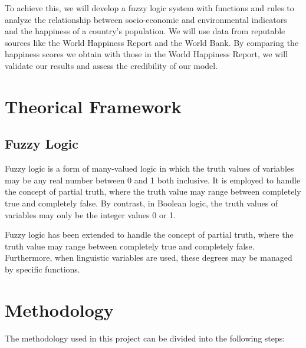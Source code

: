 \documentclass[fleqn,11pt]{article}
\begin{document}
To achieve this, we will develop a fuzzy logic system with functions and rules to analyze the relationship between socio-economic and environmental indicators and the happiness of a country's population. We will use data from reputable sources like the World Happiness Report and the World Bank. By comparing the happiness scores we obtain with those in the World Happiness Report, we will validate our results and assess the credibility of our model.
\section{Theorical Framework}

\subsection{Fuzzy Logic}
Fuzzy logic is a form of many-valued logic in which the truth values of variables may be any real number between 0 and 1 both inclusive. It is employed to handle the concept of partial truth, where the truth value may range between completely true and completely false. By contrast, in Boolean logic, the truth values of variables may only be the integer values 0 or 1.

Fuzzy logic has been extended to handle the concept of partial truth, where the truth value may range between completely true and completely false. Furthermore, when linguistic variables are used, these degrees may be managed by specific functions.

\section{Methodology}

The methodology used in this project can be divided into the following steps:
\end{document}
